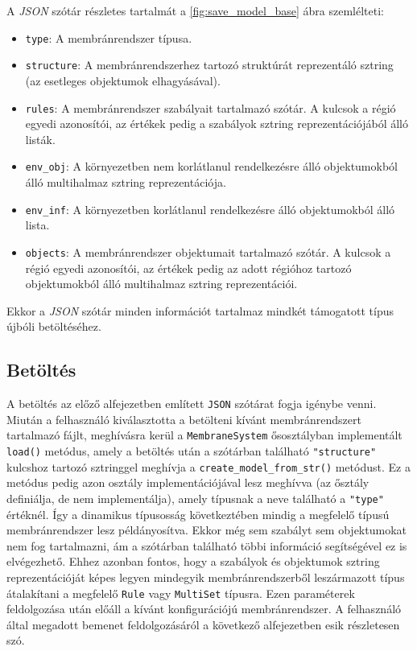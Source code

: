 A \textit{JSON} szótár részletes tartalmát a \ref{fig:save_model_base} ábra szemlélteti:
\begin{itemize}
\item \verb|type|: A membránrendszer típusa.
\item \verb|structure|: A membránrendszerhez tartozó struktúrát reprezentáló sztring (az esetleges objektumok elhagyásával).
\item \verb|rules|: A membránrendszer szabályait tartalmazó szótár. A kulcsok a régió egyedi azonosítói, az értékek pedig a szabályok sztring reprezentációjából álló listák.
\item \verb|env_obj|: A környezetben nem korlátlanul rendelkezésre álló objektumokból álló multihalmaz sztring reprezentációja.
\item \verb|env_inf|:  A környezetben korlátlanul rendelkezésre álló objektumokból álló lista.
\item \verb|objects|: A membránrendszer objektumait tartalmazó szótár. A kulcsok a régió egyedi azonosítói, az értékek pedig az adott régióhoz tartozó objektumokból álló multihalmaz sztring reprezentációi. 
\end{itemize}

Ekkor a \textit{JSON} szótár minden információt tartalmaz mindkét támogatott típus újbóli betöltéséhez.

\subsection{Betöltés}

A betöltés az előző alfejezetben említett \verb|JSON| szótárat fogja igénybe venni. Miután a felhasználó kiválasztotta a betölteni kívánt membránrendszert tartalmazó fájlt, meghívásra kerül a \verb|MembraneSystem| ősosztályban implementált \verb|load()| metódus, amely a betöltés után a szótárban található \verb|"structure"| kulcshoz tartozó sztringgel meghívja a \verb|create_model_from_str()| metódust. Ez a metódus pedig azon osztály implementációjával lesz meghívva (az ősztály definiálja, de nem implementálja), amely típusnak a neve található a \verb|"type"| értéknél. Így a dinamikus típusosság következtében mindig a megfelelő típusú membránrendszer lesz példányosítva. Ekkor még sem szabályt sem objektumokat nem fog tartalmazni, ám a szótárban található többi információ segítségével ez is elvégezhető. Ehhez azonban fontos, hogy a szabályok és objektumok sztring reprezentációját képes legyen mindegyik membránrendszerből leszármazott típus átalakítani a megfelelő \verb|Rule| vagy \verb|MultiSet| típusra. Ezen paraméterek feldolgozása után előáll a kívánt konfigurációjú membránrendszer. A felhasználó által megadott bemenet feldolgozásáról a következő alfejezetben esik részletesen szó.

